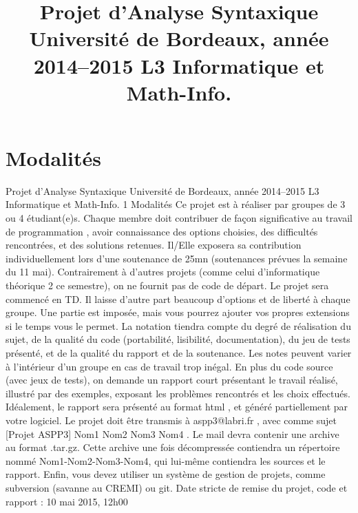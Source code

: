 \documentclass{report}
\title{Projet d’Analyse Syntaxique
Université de Bordeaux, année 2014–2015
L3 Informatique et Math-Info.}
\begin{document}
\maketitle
\tableofcontents
\section{Modalités}{
Projet d’Analyse Syntaxique
Université de Bordeaux, année 2014–2015
L3 Informatique et Math-Info.
1 Modalités
Ce projet est à réaliser par groupes de 3 ou 4 étudiant(e)s. Chaque membre doit contribuer
de façon significative au
travail de programmation
, avoir connaissance des options choisies, des
difficultés rencontrées, et des solutions retenues. Il/Elle exposera sa contribution individuellement
lors d’une soutenance de 25mn (soutenances prévues la semaine du 11 mai).
Contrairement à d’autres projets (comme celui d’informatique théorique 2 ce semestre), on ne
fournit pas de code de départ. Le projet sera commencé en TD. Il laisse d’autre part beaucoup
d’options et de liberté à chaque groupe. Une partie est imposée, mais vous pourrez ajouter vos
propres extensions si le temps vous le permet.
La notation tiendra compte du degré de réalisation du sujet, de la qualité du code (portabilité,
lisibilité, documentation), du jeu de tests présenté, et de la qualité du rapport et de la soutenance.
Les notes peuvent varier à l’intérieur d’un groupe en cas de travail trop inégal.
En plus du code source (avec jeux de tests), on demande un rapport court présentant le travail
réalisé, illustré par des exemples, exposant les problèmes rencontrés et les choix effectués. Idéalement,
le rapport sera présenté au format
html
, et généré partiellement par votre logiciel. Le projet doit
être transmis à
aspp3@labri.fr
, avec comme sujet
[Projet ASPP3] Nom1 Nom2 Nom3 Nom4
.
Le mail devra contenir une archive au format .tar.gz. Cette archive une fois décompressée contiendra
un répertoire nommé Nom1-Nom2-Nom3-Nom4, qui lui-même contiendra les sources et le rapport.
Enfin, vous devez utiliser un système de gestion de projets, comme subversion (savanne au CREMI)
ou git.
Date
stricte
de remise du projet, code et rapport : 10 mai 2015, 12h00
}
\end{document}
